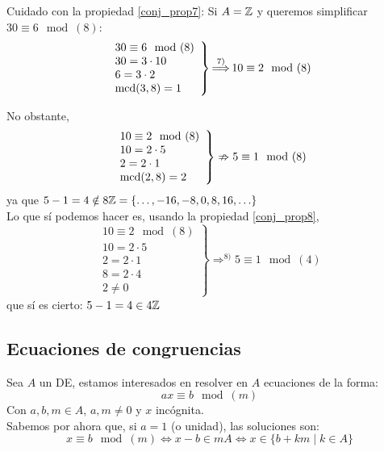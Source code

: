Cuidado con la propiedad \ref{conj_prop7}: Si $A = \mathbb Z$ y queremos simplificar $30\equiv 6\mod(8)$:
$$\left. \begin{array}{l}
        30\equiv 6\mod(8) \\
        30 = 3\cdot 10    \\
        6 = 3 \cdot 2     \\
        \operatorname{mcd}(3,8)=1
    \end{array} \right\} \mathop{\Longrightarrow}^{7)} 10 \equiv 2\mod(8)$$

No obstante,
$$\left. \begin{array}{l}
        10 \equiv 2\mod(8) \\
        10 = 2 \cdot 5     \\
        2 = 2 \cdot 1      \\
        \operatorname{mcd}(2,8) = 2
    \end{array} \right\} \nRightarrow 5\equiv 1\mod(8)$$
ya que $5-1 = 4 \notin 8\mathbb Z = \{\ldots, -16, -8, 0, 8, 16, \ldots\}$\\


Lo que sí podemos hacer es, usando la propiedad \ref{conj_prop8},
$$\left. \begin{array}{l}
        10 \equiv 2\mod(8) \\
        10 = 2 \cdot 5     \\
        2 = 2 \cdot 1      \\
        8 = 2 \cdot 4      \\
        2 \neq 0
    \end{array} \right\} \mathop{\Longrightarrow}^{8)} 5 \equiv 1\mod(4)$$
que sí es cierto: $5-1 = 4 \in 4\mathbb Z$

\subsection{Ecuaciones de congruencias}

Sea $A$ un DE, estamos interesados en resolver en $A$ ecuaciones de la forma:
$$ax\equiv b\mod(m)$$
Con $a,b,m \in A$, $a,m \neq 0$ y $x$ incógnita.\\


Sabemos por ahora que, si $a=1$ (o unidad), las soluciones son:
$$x\equiv b\mod(m) \Longleftrightarrow x-b \in mA \Longleftrightarrow x \in \{b+km \mid k \in A\}$$

